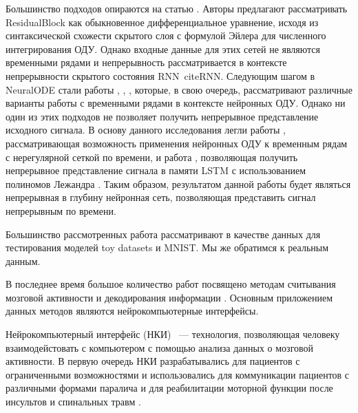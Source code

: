 \documentclass[12pt]{article}
\begin{document}
Большинство подходов опираются на статью \cite{neural_ode}. Авторы предлагают рассматривать ResidualBlock \cite{ResNet} как обыкновенное дифференциальное уравнение, исходя из синтаксической схожести скрытого слоя с формулой Эйлера для численного интегрирования ОДУ. Однако входные данные для этих сетей не являются временными рядами и непрерывность рассматривается в контексте непрерывности скрытого состояния RNN\ cite{RNN}.
Следующим шагом в NeuralODE стали работы \cite{cde}, \cite{latentode}, \cite{ode2vae}, которые, в свою очередь, рассматривают различные варианты работы с временными рядами в контексте нейронных ОДУ. Однако ни один из этих подходов не позволяет получить непрерывное представление исходного сигнала. 
В основу данного исследования легли работы \cite{cde}, рассматривающая возможность применения нейронных ОДУ к временным рядам с нерегулярной сеткой по времени, и работа \cite{lmu}, позволяющая получить непрерывное представление сигнала в памяти LSTM \cite{LSTM} с использованием полиномов Лежандра \cite{legendre_polynom}. Таким образом, результатом данной работы будет являться непрерывная в глубину нейронная сеть, позволяющая представить сигнал непрерывным по времени.

Большинство рассмотренных работа рассматривают в качестве данных для тестирования моделей toy datasets и MNIST\cite{mnist}. Мы же обратимся к реальным данным.

В последнее время большое количество работ посвящено методам считывания мозговой активности и декодирования информации \cite{Hu2018,Song2017,Loza2017,Eliseyev2016,Gaglianese2016,Bundy2016,Morishita2014}. Основным приложением данных методов являются нейрокомпьютерные интерфейсы.

Нейрокомпьютерный интерфейс (НКИ) ~--- технология, позволяющая человеку взаимодейстовать с компьютером с помощью анализа данных о мозговой активности. 
В первую очередь НКИ разрабатывались для пациентов с ограниченными возможностями и использовались для коммуникации пациентов с различными формами паралича и для реабилитации моторной функции после инсультов и спинальных травм \cite{chaudhary2020neuropsychological}.
\end{document}
